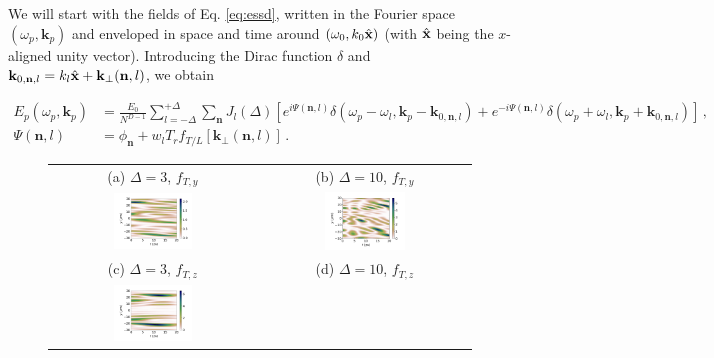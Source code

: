 \documentclass[
 reprint,
 amsmath,amssymb,
 aps,
]{revtex4-1}
\begin{document}
We will start with the fields of Eq. \eqref{eq:essd}, written in the Fourier space $(\omega_p,\mathbf{k}_p)$ and enveloped in space and time around $(\omega_0,k_0\Hat{\mathbf{x}} )$ (with $\Hat{\mathbf{x}}$ being the $x$-aligned unity vector).  Introducing the Dirac function $\delta$ and $\mathbf{k}_{0,\mathbf{n},l}=k_l\Hat{\mathbf{x}} + \mathbf{k}_\perp(\mathbf{n},l)$, we obtain
\begin{widetext}
\begin{align}
    E_p(\omega_p,\mathbf{k}_p)& =\frac{E_0}{N^{D-1}}   \sum_{l=-\Delta}^{+\Delta}  \sum_{\mathbf{n}}   J_l(\Delta) 
    [ e^{i \Psi(\mathbf{n},l)  }    \delta(\omega_p-\omega_l, \mathbf{k}_p-\mathbf{k}_{0,\mathbf{n},l})    +
     e^{-i \Psi(\mathbf{n},l)  }   \delta(\omega_p+\omega_l, \mathbf{k}_p+\mathbf{k}_{0,\mathbf{n},l}) ]
    \, , \label{eq:essdwk}  \\
    \Psi(\mathbf{n},l) &= \phi_{\mathbf{n}}  + w_l T_{r} f_{T/L}[\mathbf{k}_\perp(\mathbf{n},l)] \, .\label{eq:essdwk_psi} 
\end{align}
\begin{figure}
    \centering
    \begin{tabular}{cc}
        (a) $\Delta=3$, $f_{T,y}$ &  (b) $\Delta=10$, $f_{T,y}$ \\
            \includegraphics[width=0.4\textwidth]{ESSD_yt_m3.png}
         &  \includegraphics[width=0.4\textwidth]{ESSD_yt_m10.png} \\
         (c) $\Delta=3$, $f_{T,z}$ &  (d) $\Delta=10$, $f_{T,z}$   \\
            \includegraphics[width=0.4\textwidth]{ESSD_yt_m3_ft0.png}

\end{tabular}
\end{figure}
\end{widetext}
\end{document}
